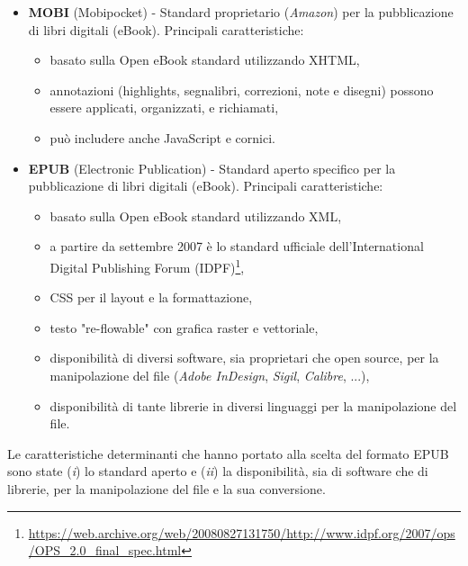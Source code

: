 \begin{itemize}
    \item \textbf{MOBI} (Mobipocket) - Standard proprietario (\textit{Amazon}) per la pubblicazione di libri digitali (eBook). Principali caratteristiche:
    \begin{itemize}
        \item basato sulla Open eBook standard utilizzando XHTML,
        \item annotazioni (highlights, segnalibri, correzioni, note e disegni) possono essere applicati, organizzati, e richiamati,
        \item può includere anche JavaScript e cornici.
    \end{itemize}
    \item \textbf{EPUB} (Electronic Publication) - Standard aperto specifico per la pubblicazione di libri digitali (eBook). Principali caratteristiche:
    \begin{itemize}
        \item basato sulla Open eBook standard utilizzando XML,
        \item a partire da settembre 2007 è lo standard ufficiale dell'International Digital Publishing Forum (IDPF)\footnote{\url{https://web.archive.org/web/20080827131750/http://www.idpf.org/2007/ops/OPS_2.0_final_spec.html}},
        \item CSS per il layout e la formattazione,
        \item testo "re-flowable" con grafica raster e vettoriale,
        \item disponibilità di diversi software, sia proprietari che open source, per la manipolazione del file (\textit{Adobe InDesign}, \textit{Sigil}, \textit{Calibre}, ...),
        \item disponibilità di tante librerie in diversi linguaggi per la manipolazione del file.
    \end{itemize}
\end{itemize}
Le caratteristiche determinanti che hanno portato alla scelta del formato EPUB sono state (\textit{i}) lo standard aperto e (\textit{ii}) la disponibilità, sia di software che di librerie, per la manipolazione del file e la sua conversione.

